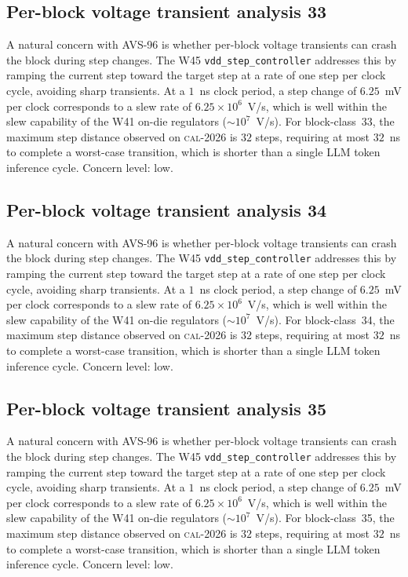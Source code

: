 \subsection{Per-block voltage transient analysis 33}

A natural concern with AVS-96 is whether per-block voltage transients
can crash the block during step changes. The W45 \texttt{vdd\_step\_controller} addresses this by ramping the current
step toward the target step at a rate of one step per clock cycle,
avoiding sharp transients. At a $1$~ns clock period, a step change of
$6.25$~mV per clock corresponds to a slew rate of $6.25\times 10^6$~V/s,
which is well within the slew capability of the W41 on-die regulators
($\sim 10^7$~V/s). For block-class~33, the maximum step distance
observed on \textsc{cal-2026} is $32$ steps, requiring at most $32$~ns
to complete a worst-case transition, which is shorter than a single
LLM token inference cycle. Concern level: low.


\subsection{Per-block voltage transient analysis 34}

A natural concern with AVS-96 is whether per-block voltage transients
can crash the block during step changes. The W45 \texttt{vdd\_step\_controller} addresses this by ramping the current
step toward the target step at a rate of one step per clock cycle,
avoiding sharp transients. At a $1$~ns clock period, a step change of
$6.25$~mV per clock corresponds to a slew rate of $6.25\times 10^6$~V/s,
which is well within the slew capability of the W41 on-die regulators
($\sim 10^7$~V/s). For block-class~34, the maximum step distance
observed on \textsc{cal-2026} is $32$ steps, requiring at most $32$~ns
to complete a worst-case transition, which is shorter than a single
LLM token inference cycle. Concern level: low.


\subsection{Per-block voltage transient analysis 35}

A natural concern with AVS-96 is whether per-block voltage transients
can crash the block during step changes. The W45 \texttt{vdd\_step\_controller} addresses this by ramping the current
step toward the target step at a rate of one step per clock cycle,
avoiding sharp transients. At a $1$~ns clock period, a step change of
$6.25$~mV per clock corresponds to a slew rate of $6.25\times 10^6$~V/s,
which is well within the slew capability of the W41 on-die regulators
($\sim 10^7$~V/s). For block-class~35, the maximum step distance
observed on \textsc{cal-2026} is $32$ steps, requiring at most $32$~ns
to complete a worst-case transition, which is shorter than a single
LLM token inference cycle. Concern level: low.


